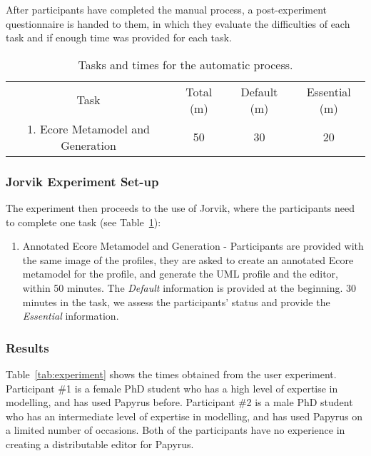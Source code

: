 After participants have completed the manual process, a post-experiment questionnaire is handed to them, in which they evaluate the difficulties of each task and if enough time was provided for each task.

\begin{table}[ht!]
	\centering
	\setlength{\tabcolsep}{3.5pt} 
	\begin{tabular}{|c|c|c|c|}
		Task & Total (m) & Default (m) & Essential (m) \\ 
		1. Ecore Metamodel and Generation & 50 & 30 & 20 \\
	\end{tabular}
	\caption{Tasks and times for the automatic process.}
	\label{tab:automatic}
\end{table}

\subsubsection{Jorvik Experiment Set-up}
The experiment then proceeds to the use of Jorvik, where the participants need to complete one task (see Table~\ref{tab:automatic}):
\begin{enumerate}
	\item Annotated Ecore Metamodel and Generation - Participants are provided with the same image of the profiles, they are asked to create an annotated Ecore metamodel for the profile, and generate the UML profile and the editor, within 50 minutes.
	The \textit{Default} information is provided at the beginning. 
	30 minutes in the task, we assess the participants' status and provide the \textit{Essential} information.
\end{enumerate}



\subsubsection{Results}
Table~\ref{tab:experiment} shows the times obtained from the user experiment.
Participant \#1 is a female PhD student who has a high level of expertise in modelling, and has used Papyrus before.
Participant \#2 is a male PhD student who has an intermediate level of expertise in modelling, and has used Papyrus on a limited number of occasions. 
Both of the participants have no experience in creating a distributable editor for Papyrus.

